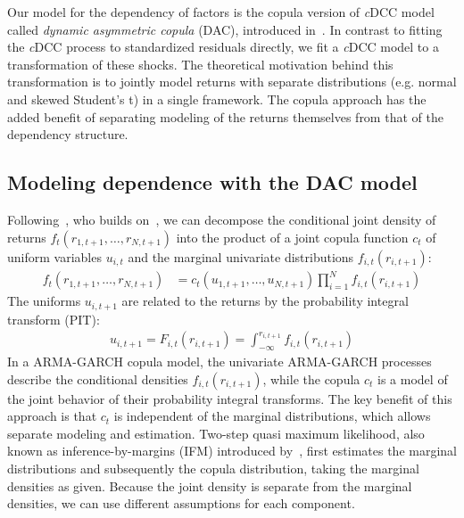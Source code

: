Our model for the dependency of factors is the copula version of \emph{c}DCC model called \emph{dynamic asymmetric copula} (DAC), introduced in~\autocite{ChristoffersenErrunzaJacobLanglois2012}. In contrast to fitting the \emph{c}DCC process to standardized residuals directly, we fit a \emph{c}DCC model to a transformation of these shocks. The theoretical motivation behind this transformation is to jointly model returns with separate distributions (e.g. normal and skewed Student's t) in a single framework. The copula approach has the added benefit of separating modeling of the returns themselves from that of the dependency structure.


\subsection{Modeling dependence with the DAC model} %
\label{sub:copula}

Following~\autocite{ChristoffersenErrunzaJacobLanglois2012}, who builds on~\autocite{Patton2006,Sklar1959}, we can decompose the conditional joint density of returns $f_t(r_{1, t+1}, \ldots, r_{N, t+1})$ into the product of a joint copula function $c_t$ of uniform variables $u_{i,t}$ and the marginal univariate distributions $f_{i,t}(r_{i, t+1})$:
\begin{align}
  f_t(r_{1, t+1}, \ldots, r_{N, t+1}) &=
    c_t(u_{1, t+1}, \ldots, u_{N, t+1}) \prod^N_{i = 1}
    f_{i,t}(r_{i, t + 1})
\end{align}
The uniforms $u_{i, t+1}$ are related to the returns by the probability integral transform (PIT):
\begin{align}
  u_{i, t+1} = F_{i,t}(r_{i, t+1}) =
    \int_{-\infty}^{r_{i, t + 1}} f_{i,t}(r_{i, t+1})
\end{align}
In a ARMA-GARCH copula model, the univariate ARMA-GARCH processes describe the conditional densities $f_{i,t}(r_{i, t+1})$, while the copula $c_t$ is a model of the joint behavior of their probability integral transforms. The key benefit of this approach is that $c_t$ is independent of the marginal distributions, which allows separate modeling and estimation. Two-step quasi maximum likelihood, also known as inference-by-margins (IFM) introduced by~\autocite{Joe1997}, first estimates the marginal distributions and subsequently the copula distribution, taking the marginal densities as given. Because the joint density is separate from the marginal densities, we can use different assumptions for each component.

